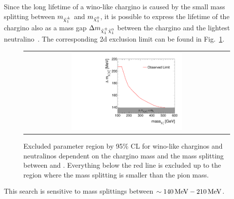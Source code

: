 Since the long lifetime of a wino-like chargino is caused by the small mass splitting between $m_{\tilde{\chi}^{\pm}_{1}}$ and $m_{\tilde{\chi}^{0}_{1}}$, 
it is possible to express the lifetime of the chargino also as a mass gap $\Delta m_{\tilde{\chi}^{\pm}_{1}\tilde{\chi}^{0}_{1}}$ between the chargino and the lightest neutralino~\cite{bib:MassSplitting_Drees}.
The corresponding 2d exclusion limit can be found in Fig.~\ref{fig:DeltaMLimit2d}.
\begin{figure}[!t]
  \centering 
  \begin{tabular}{c}
    \includegraphics[width=0.55\textwidth]{figures/analysis/Interpretation/MassSplittingLimitPlot.pdf} 
  \end{tabular}
  \caption{Excluded parameter region by 95\% CL for wino-like charginos and neutralinos dependent on the chargino mass and the mass splitting between \chipm and \chiO.
           Everything below the red line is excluded up to the region where the mass splitting is smaller than the pion mass.}
  \label{fig:DeltaMLimit2d}
\end{figure} 
This search is sensitive to mass splittings between $\sim 140\,\text{Me}\kern-0.06667em\text{V}-210\,\text{Me}\kern-0.06667em\text{V}$.\\

